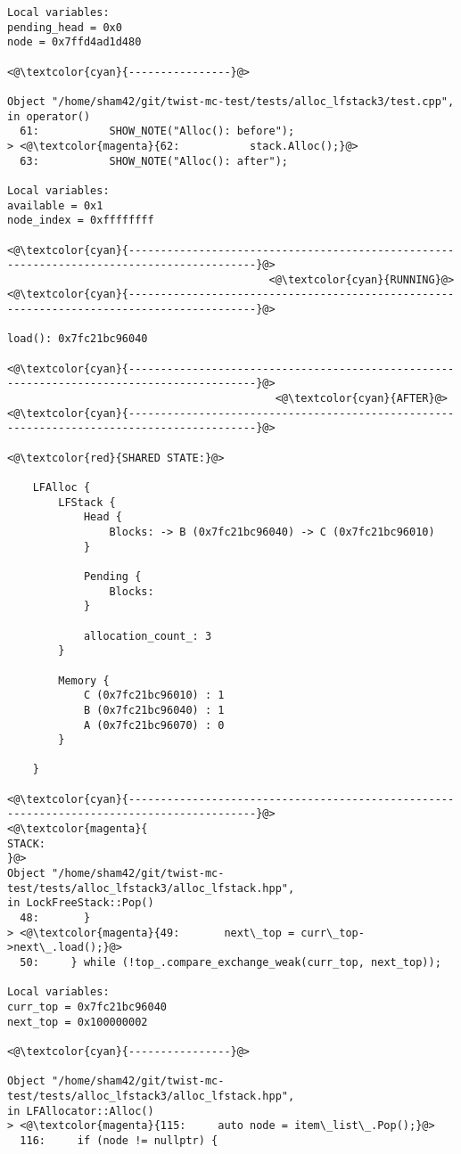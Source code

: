 \begin{adjustwidth}{-3.3cm}{-1cm}
\begin{allintypewriter}
\begin{multicols*}{2}
\begin{lstlisting}[numbers=none]
Local variables: 
pending_head = 0x0
node = 0x7ffd4ad1d480

<@\textcolor{cyan}{----------------}@>

Object "/home/sham42/git/twist-mc-test/tests/alloc_lfstack3/test.cpp",
in operator()
  61:           SHOW_NOTE("Alloc(): before");
> <@\textcolor{magenta}{62:           stack.Alloc();}@>
  63:           SHOW_NOTE("Alloc(): after");

Local variables: 
available = 0x1
node_index = 0xffffffff

<@\textcolor{cyan}{------------------------------------------------------------------------------------------}@>
                                         <@\textcolor{cyan}{RUNNING}@>
<@\textcolor{cyan}{------------------------------------------------------------------------------------------}@>

load(): 0x7fc21bc96040

<@\textcolor{cyan}{------------------------------------------------------------------------------------------}@>
                                          <@\textcolor{cyan}{AFTER}@>
<@\textcolor{cyan}{------------------------------------------------------------------------------------------}@>

<@\textcolor{red}{SHARED STATE:}@>

    LFAlloc {
	    LFStack {
		    Head {
			    Blocks: -> B (0x7fc21bc96040) -> C (0x7fc21bc96010) 
		    }

		    Pending {
			    Blocks: 
		    }

		    allocation_count_: 3
	    }

	    Memory {
		    C (0x7fc21bc96010) : 1
		    B (0x7fc21bc96040) : 1
		    A (0x7fc21bc96070) : 0
	    }

    }

<@\textcolor{cyan}{------------------------------------------------------------------------------------------}@>
<@\textcolor{magenta}{
STACK:
}@>
Object "/home/sham42/git/twist-mc-test/tests/alloc_lfstack3/alloc_lfstack.hpp",
in LockFreeStack::Pop()
  48:       }
> <@\textcolor{magenta}{49:       next\_top = curr\_top->next\_.load();}@>
  50:     } while (!top_.compare_exchange_weak(curr_top, next_top));

Local variables: 
curr_top = 0x7fc21bc96040
next_top = 0x100000002

<@\textcolor{cyan}{----------------}@>

Object "/home/sham42/git/twist-mc-test/tests/alloc_lfstack3/alloc_lfstack.hpp",
in LFAllocator::Alloc()
> <@\textcolor{magenta}{115:     auto node = item\_list\_.Pop();}@>
  116:     if (node != nullptr) {


\end{lstlisting}
\end{multicols*}
\end{allintypewriter}
\end{adjustwidth}
